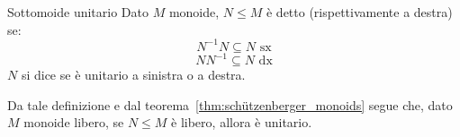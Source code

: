 \begin{definition}{Sottomoide unitario}
  Dato \(M\) monoide, \(N \leq M\) è detto  (rispettivamente a destra) se:
  \[N^{-1}N \subseteq N \text{ sx}\]
  \[NN^{-1} \subseteq N \text{ dx}\]
  \(N\) si dice  se è unitario a sinistra o a destra.
\end{definition}

Da tale definizione e dal teorema~\ref{thm:schützenberger_monoids} segue che, dato \(M\) monoide libero, se \(N \leq M\) è libero, allora è unitario.

